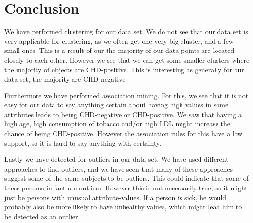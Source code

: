 \section{Conclusion}

We have performed clustering for our data set. We do not see that our data set is very applicable for clustering, as we often get one very big cluster, and a few small ones. This is a result of our the majority of our data points are located closely to each other. However we see that we can get some smaller clusters where the majority of objects are CHD-positive. This is interesting as generally for our data set, the majority are CHD-negative.

Furthermore we have performed association mining. For this, we see that it is not easy for our data to say anything certain about having high values in some attributes leads to being CHD-negative or CHD-positive. We saw that having a high age, high consumption of tobacco and/or high LDL might increase the chance of being CHD-positive. However the association rules for this have a low support, so it is hard to say anything with certainty.

Lastly we have detected for outliers in our data set. We have used different approaches to find outliers, and we have seen that many of these approaches suggest some of the same subjects to be outliers. This could indicate that some of these persons in fact are outliers. However this is not necessarily true, as it might just be persons with unusual attribute-values. If a person is sick, he would probably also be more likely to have unhealthy values, which might lead him to be detected as an outlier.